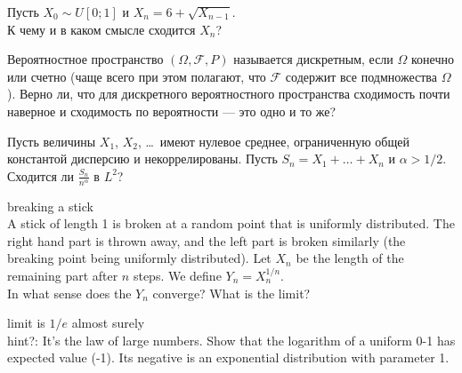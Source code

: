 \begin{problem}
Пусть $X_{0}\sim U[0;1]$ и $X_{n}=6+\sqrt{X_{n-1}}$. \\
К чему и в каком смысле сходится $X_{n}$?

\begin{sol}

\end{sol}
\end{problem}

\begin{problem}
Вероятностное пространство $(\Omega,\mathcal{F},P)$ называется
дискретным, если $\Omega$ конечно или счетно (чаще всего при этом
полагают, что $\mathcal{F}$ содержит все подмножества $\Omega$).
Верно ли, что для дискретного вероятностного пространства
сходимость почти наверное и сходимость по вероятности — это одно и
то же?

\begin{sol}

\end{sol}
\end{problem}

\begin{problem}
Пусть величины $X_{1}$, $X_{2}$, \ldots~имеют нулевое среднее, ограниченную общей константой дисперсию и некоррелированы. Пусть $S_{n}=X_{1}+\ldots+X_{n}$ и $\alpha>1/2$.\\
Сходится ли $\frac{S_{n}}{n^{\alpha}}$ в $L^{2}$?

\begin{sol}

\end{sol}
\end{problem}

\begin{problem}
 breaking a stick \\
A stick of length 1 is broken at a random point that is uniformly distributed. The right hand part is thrown away, and the left part is broken similarly (the breaking point being uniformly distributed). Let $X_{n}$ be the length of the remaining part after $n$ steps. We define $Y_{n}=X_{n}^{1/n}$. \\
In what sense does the $Y_{n}$ converge? What is the limit?

\begin{sol}

limit is $1/e$ almost surely \\
hint?: It's the law of large numbers. Show that the logarithm of a uniform 0-1 has expected value (-1). Its negative is an exponential distribution with parameter 1.
\end{sol}
\end{problem}

